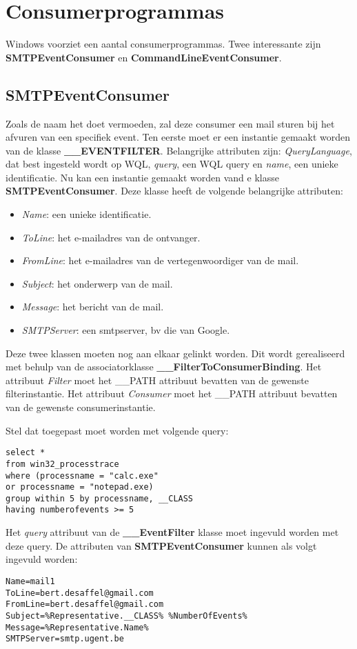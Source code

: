 \documentclass{report}
\begin{document}
	\section{Consumerprogrammas}
	Windows voorziet een aantal consumerprogrammas. Twee interessante zijn \textbf{SMTPEventConsumer} en \textbf{CommandLineEventConsumer}.
	\subsection{SMTPEventConsumer}
	Zoals de naam het doet vermoeden, zal deze consumer een mail sturen bij het afvuren van een specifiek event. Ten eerste moet er een instantie gemaakt worden van de klasse \textbf{\_\_EVENTFILTER}. Belangrijke attributen zijn: \textit{QueryLanguage}, dat best ingesteld wordt op WQL, \textit{query}, een WQL query en \textit{name}, een unieke identificatie. Nu kan een instantie gemaakt worden vand e klasse \textbf{SMTPEventConsumer}. Deze klasse heeft de volgende belangrijke attributen:
	\begin{itemize}
		\item \textit{Name}: een unieke identificatie.
		\item \textit{ToLine}: het e-mailadres van de ontvanger.
		\item \textit{FromLine}: het e-mailadres van de vertegenwoordiger van de mail.
		\item \textit{Subject}: het onderwerp van de mail.
		\item \textit{Message}: het bericht van de mail.
		\item \textit{SMTPServer}: een smtpserver, bv die van Google.
	\end{itemize}

	Deze twee klassen moeten nog aan elkaar gelinkt worden. Dit wordt gerealiseerd met behulp van de associatorklasse \textbf{\_\_FilterToConsumerBinding}. Het attribuut \textit{Filter} moet het \_\_PATH attribuut bevatten van de gewenste filterinstantie. Het attribuut \textit{Consumer} moet het \_\_PATH attribuut bevatten van de gewenste consumerinstantie.
	
	Stel dat toegepast moet worden met volgende query:
	\begin{lstlisting}
select * 
from win32_processtrace
where (processname = "calc.exe"
or processname = "notepad.exe)
group within 5 by processname, __CLASS
having numberofevents >= 5
	\end{lstlisting}
	Het \textit{query} attribuut van de \textbf{\_\_EventFilter} klasse moet ingevuld worden met deze query. 
	De attributen van \textbf{SMTPEventConsumer} kunnen als volgt ingevuld worden:
	\begin{lstlisting}
Name=mail1
ToLine=bert.desaffel@gmail.com
FromLine=bert.desaffel@gmail.com
Subject=%Representative.__CLASS% %NumberOfEvents%
Message=%Representative.Name%
SMTPServer=smtp.ugent.be
	\end{lstlisting}
	
\end{document}
